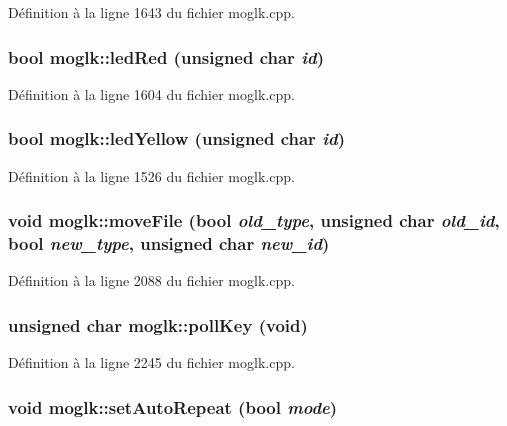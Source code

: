 Définition à la ligne 1643 du fichier moglk.cpp.\hypertarget{classmoglk_9ddc6b3f833eff3fe4abc3c80ec6e0a1}{
\subsubsection[{ledRed}]{\setlength{\rightskip}{0pt plus 5cm}bool moglk::ledRed (unsigned char {\em id})}}
\label{classmoglk_9ddc6b3f833eff3fe4abc3c80ec6e0a1}




Définition à la ligne 1604 du fichier moglk.cpp.\hypertarget{classmoglk_f21d21869ca65ab294c0666b1c0690f3}{
\subsubsection[{ledYellow}]{\setlength{\rightskip}{0pt plus 5cm}bool moglk::ledYellow (unsigned char {\em id})}}
\label{classmoglk_f21d21869ca65ab294c0666b1c0690f3}




Définition à la ligne 1526 du fichier moglk.cpp.\hypertarget{classmoglk_c2bcc785f03c46e32f27486704bd559a}{
\subsubsection[{moveFile}]{\setlength{\rightskip}{0pt plus 5cm}void moglk::moveFile (bool {\em old\_\-type}, \/  unsigned char {\em old\_\-id}, \/  bool {\em new\_\-type}, \/  unsigned char {\em new\_\-id})}}
\label{classmoglk_c2bcc785f03c46e32f27486704bd559a}




Définition à la ligne 2088 du fichier moglk.cpp.\hypertarget{classmoglk_7892be0a8494f02f08f57981d31932cd}{
\subsubsection[{pollKey}]{\setlength{\rightskip}{0pt plus 5cm}unsigned char moglk::pollKey (void)}}
\label{classmoglk_7892be0a8494f02f08f57981d31932cd}




Définition à la ligne 2245 du fichier moglk.cpp.\hypertarget{classmoglk_7679c4288b4ff96cf0259dbda8a852e7}{
\subsubsection[{setAutoRepeat}]{\setlength{\rightskip}{0pt plus 5cm}void moglk::setAutoRepeat (bool {\em mode})}}
\label{classmoglk_7679c4288b4ff96cf0259dbda8a852e7}




